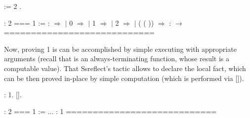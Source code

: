 \begin{coqdoccode}
\coqdocemptyline
\coqdocnoindent
{}   :=    2    .\coqdoceol
\coqdocemptyline
\end{coqdoccode}


\coqdoceol
\coqdocemptyline
\coqdocindent{1.00em}
 : 2 === 1\coqdoceol
\coqdocindent{1.00em}
 :=   :  \ensuremath{\Rightarrow}\coqdoceol
\coqdocindent{3.50em}
  \coqdoceol
\coqdocindent{3.50em}
\ensuremath{|} 0 \ensuremath{\Rightarrow} \coqdoceol
\coqdocindent{3.50em}
\ensuremath{|} 1 \ensuremath{\Rightarrow} \coqdoceol
\coqdocindent{3.50em}
\ensuremath{|} 2 \ensuremath{\Rightarrow} \coqdoceol
\coqdocindent{3.50em}
\ensuremath{|}  ( ( \coqdocvar{\_})) \ensuremath{\Rightarrow} \coqdoceol
\coqdocindent{3.50em}
 :  \ensuremath{\rightarrow} \coqdoceol
\coqdocindent{1.00em}
============================\coqdoceol
\coqdocindent{1.50em}

\coqdocemptyline


Now, proving  1 is  can be accomplished by simple executing
 with appropriate arguments (recall that  is an
always-terminating function, whose result is a computable value). That
Ssreflect's tactic  allows to declare the local
fact, which can be then proved in-place by simple computation (which
is performed via  []).


\begin{coqdoccode}
\coqdocemptyline
\coqdocnoindent
{} :  1.\coqdoceol
\coqdocnoindent
{} [].\coqdoceol
\coqdocemptyline
\end{coqdoccode}


\coqdoceol
\coqdocemptyline
\coqdocindent{1.00em}
 : 2 === 1\coqdoceol
\coqdocindent{1.00em}
 := ...\coqdoceol
\coqdocindent{1.00em}
 :  1\coqdoceol
\coqdocindent{1.00em}
============================\coqdoceol
\coqdocindent{1.50em}

